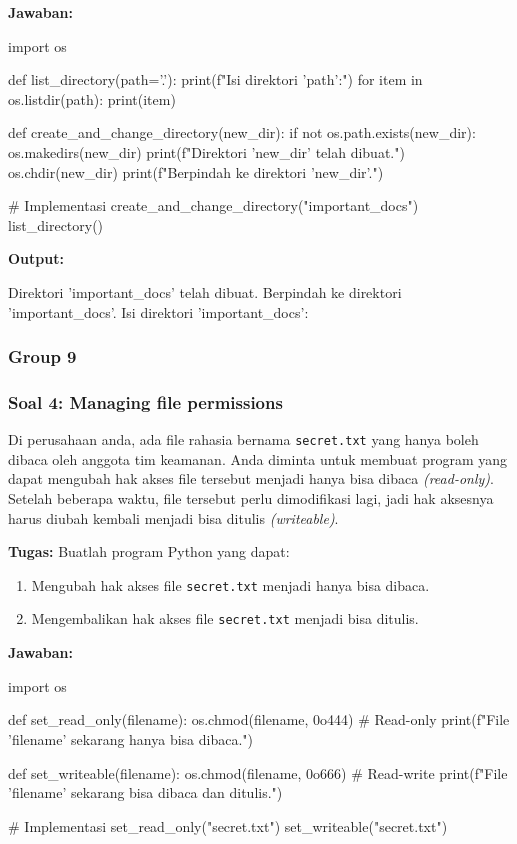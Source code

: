 \documentclass[12pt]{article}
\begin{document}
\textbf{Jawaban:}
\begin{python}
import os

def list_directory(path='.'):
    print(f"Isi direktori '{path}':")
    for item in os.listdir(path):
        print(item)

def create_and_change_directory(new_dir):
    if not os.path.exists(new_dir):
        os.makedirs(new_dir)
        print(f"Direktori '{new_dir}' telah dibuat.")
    os.chdir(new_dir)
    print(f"Berpindah ke direktori '{new_dir}'.")

# Implementasi
create_and_change_directory("important_docs")
list_directory()
\end{python}

\textbf{Output:}
\begin{python}
Direktori 'important_docs' telah dibuat.
Berpindah ke direktori 'important_docs'.
Isi direktori 'important_docs':
\end{python}

\subsubsection{Group 9}
\subsubsection*{Soal 4: Managing file permissions}
Di perusahaan anda, ada file rahasia bernama \texttt{secret.txt} yang hanya boleh dibaca oleh anggota tim keamanan. Anda diminta untuk membuat program yang dapat mengubah hak akses file tersebut menjadi hanya bisa dibaca \textit{(read-only)}. Setelah beberapa waktu, file tersebut perlu dimodifikasi lagi, jadi hak aksesnya harus diubah kembali menjadi bisa ditulis \textit{(writeable)}.

\textbf{Tugas:} Buatlah program Python yang dapat:
\begin{enumerate}
    \item Mengubah hak akses file \texttt{secret.txt} menjadi hanya bisa dibaca.
    \item Mengembalikan hak akses file \texttt{secret.txt} menjadi bisa ditulis.
\end{enumerate}

\textbf{Jawaban:}
\begin{python}
import os

def set_read_only(filename):
    os.chmod(filename, 0o444)  # Read-only
    print(f"File '{filename}' sekarang hanya bisa dibaca.")

def set_writeable(filename):
    os.chmod(filename, 0o666)  # Read-write
    print(f"File '{filename}' sekarang bisa dibaca dan ditulis.")

# Implementasi
set_read_only("secret.txt")
set_writeable("secret.txt")
\end{python}
\end{document}
